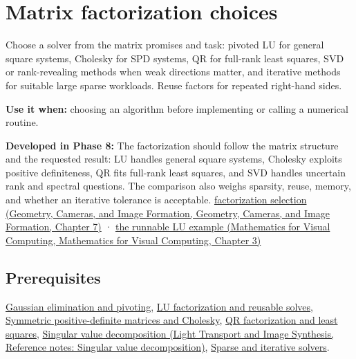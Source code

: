 \hypertarget{appendix-221a483bec2d}{}\label{referencestart:appendix-221a483bec2d}
\section{Matrix factorization choices}\label{appendix-221a483bec2d-matrix-factorization-choices}

Choose a solver from the matrix promises and task: pivoted LU for general square systems, Cholesky for SPD systems, QR for full-rank least squares, SVD or rank-revealing methods when weak directions matter, and iterative methods for suitable large sparse workloads. Reuse factors for repeated right-hand sides.

\textbf{Use it when:} choosing an algorithm before implementing or calling a numerical routine.

\textbf{Developed in Phase 8:} The factorization should follow the matrix structure and the requested result: LU handles general square systems, Cholesky exploits positive definiteness, QR fits full-rank least squares, and SVD handles uncertain rank and spectral questions. The comparison also weighs sparsity, reuse, memory, and whether an iterative tolerance is acceptable. \href{../03-Geometry-Cameras-and-Image-Formation/main.pdf\#nameddest=02-foundations-ii-ch038-choose-a-factorization-from-structure-and-the-requested-answer}{factorization selection (Geometry, Cameras, and Image Formation, Geometry, Cameras, and Image Formation, Chapter 7)} · \href{../02-Mathematics-for-Visual-Computing/main.pdf\#nameddest=01-foundations-i-ch019-a-runnable-pivoted-lu-reference-preserves-the-elimination-history}{the runnable LU example (Mathematics for Visual Computing, Mathematics for Visual Computing, Chapter 3)}

\subsection{Prerequisites}\label{appendix-221a483bec2d-prerequisites}

\hyperref[appendix-f6e77f4a200f]{Gaussian elimination and pivoting}, \hyperref[appendix-55e4b5b0a1e6]{LU factorization and reusable solves}, \hyperref[appendix-50d2ea3c9b26]{Symmetric positive-definite matrices and Cholesky}, \hyperref[appendix-c3421e6b4f2c]{QR factorization and least squares}, \href{../04-Light-Transport-and-Image-Synthesis/main.pdf\#nameddest=appendix-1fad5e7f36fa}{Singular value decomposition (Light Transport and Image Synthesis, Reference notes: Singular value decomposition)}, \hyperref[appendix-67c87a3d9e94]{Sparse and iterative solvers}.

